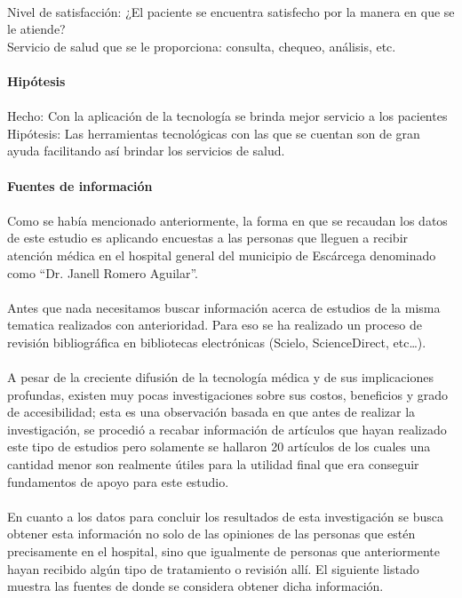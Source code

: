 \documentclass [a4paper, 12pt]{report}
\begin{document}
 \\
Nivel de satisfacción: ¿El paciente se encuentra satisfecho por la manera en que se le atiende? \\
Servicio de salud que se le proporciona: consulta, chequeo, análisis, etc. \\
 \\
\textbf{Hipótesis} \\
 \\
Hecho: Con la aplicación de la tecnología se brinda mejor servicio a los pacientes \\
Hipótesis: Las herramientas tecnológicas con las que se cuentan son de gran ayuda facilitando así brindar los servicios de salud. \\
 \\
\textbf{Fuentes de información} \\
 \\
Como se había mencionado anteriormente, la forma en que se recaudan los datos de este estudio es aplicando encuestas a las personas que lleguen a recibir atención médica en el hospital general del municipio de Escárcega denominado como “Dr. Janell Romero Aguilar”.  \\
\\
Antes que nada necesitamos buscar información acerca de estudios de la misma tematica realizados con anterioridad. Para eso se ha realizado un proceso de revisión bibliográfica en bibliotecas electrónicas (Scielo, ScienceDirect, etc…). \\
\\
A pesar de la creciente difusión de la tecnología médica y de sus implicaciones profundas, existen muy pocas investigaciones sobre sus costos, beneficios y grado de accesibilidad; esta es una observación basada en que antes de realizar la investigación, se procedió a recabar información de artículos que hayan  realizado este tipo de estudios pero solamente se hallaron 20 artículos de los cuales una cantidad menor son realmente útiles para la utilidad final que era conseguir fundamentos de apoyo para este estudio. \\
 \\
En cuanto a los datos para concluir los resultados de esta investigación se busca obtener esta información no solo de las opiniones de las personas que estén precisamente en el hospital, sino que igualmente de personas que anteriormente hayan recibido algún tipo de tratamiento o revisión allí. El siguiente listado muestra las  fuentes de donde se considera obtener dicha información. \\
\end{document}

